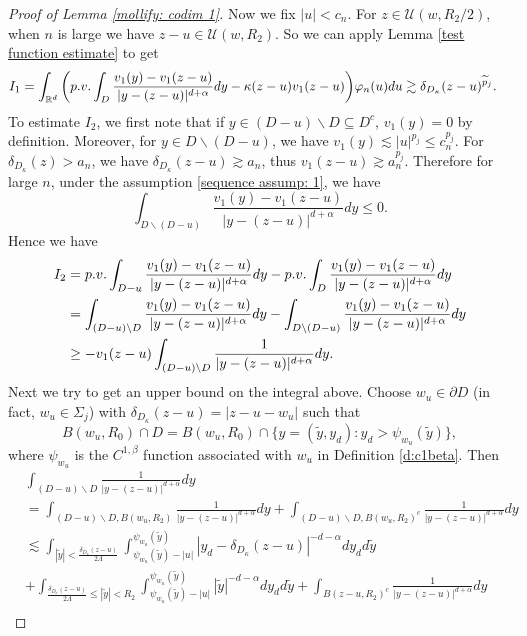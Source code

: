 \documentclass[12pt,a4paper]{amsart}
\numberwithin{equation}{section}
\theoremstyle{plain}
\newcommand{\be}{\beta}
\newcommand{\Si}{\Sigma}
\newcommand{\mc}{\mathcal}
\newcommand{\mb}{\mathbb}
\newcommand{\wt}{\widetilde}
\newcommand{\1}{\mathbbm{1}}
\begin{document}
\begin{proof}[Proof of Lemma \ref{mollify: codim 1}]
Now we fix $|u|<c_n$. For $z \in \mc U(w, R_2/2)$, when $n$ is large we have $z-u \in  \mc U(w, R_2)$. So we can apply Lemma \ref{test function estimate} to get
\begin{align*}
I_1 & = \int_{\mb R^d} \bigg({\rm p.v.}\int_{D} \frac{v_1(y) - v_1(z-u)}{|y-(z-u)|^{d+\alpha}}dy - \kappa(z-u)v_1(z-u) \bigg) \varphi_n(u)du \gtrsim \delta_{D_{\kappa}}(z-u)^{\wt p_j}.
\end{align*}
To estimate $I_2$,  we first note that if 
$y \in (D-u)\backslash D \subseteq D^c$, $v_1(y) = 0$ by definition. 
Moreover, for $y \in D\backslash (D-u)$, we have $v_1(y) \lesssim |u|^{p_j} \le c_n^{p_j}$. 
For $\delta_{D_{\kappa}}(z)>a_n$, we have $\delta_{D_{\kappa}}(z-u) \gtrsim a_n$, thus $v_1(z-u) \gtrsim a_n^{p_j}$. Therefore for large $n$, under the assumption \eqref{sequence assump: 1},  we have
$$\int_{D \backslash (D-u)} \frac{v_1(y) - v_1(z-u)}{|y-(z-u)|^{d+\alpha}}dy \le 0.$$
Hence we have 
\begin{align*}
I_2 & = {\rm p.v.}\int_{D -u} \frac{v_1(y) - v_1(z-u)}{|y-(z-u)|^{d+\alpha}}dy   - {\rm p.v.}\int_{D} \frac{v_1(y) - v_1(z-u)}{|y-(z-u)|^{d+\alpha}}dy \\
& = \int_{(D-u)\backslash D} \frac{v_1(y) - v_1(z-u)}{|y-(z-u)|^{d+\alpha}}dy - \int_{D \backslash (D-u)} \frac{v_1(y) - v_1(z-u)}{|y-(z-u)|^{d+\alpha}}dy \\
& \ge -v_1(z-u) \int_{(D-u)\backslash D} \frac{1}{|y-(z-u)|^{d+\alpha}}dy.
\end{align*} 
Next we try to get an upper bound on the integral above.
Choose $w_u \in \partial D$ (in fact, $w_u \in \Si_{j}$) with $\delta_{D_{\kappa}}(z-u) = |z-u - w_u|$ such that 
$$
B(w_u,R_0)\cap D = B(w_u,R_0) \cap \{y = (\wt y, y_d): y_d > 
\psi_{w_u}(\wt y)\},
$$
where $\psi_{w_u}$ is the $C^{1,\be}$ function associated with $w_u$ in Definition \ref{d:c1beta}. Then
\begin{align*}
& \int_{(D-u)\backslash D} \frac{1}{|y-(z-u)|^{d+\alpha}}dy \\
& = 
\int_{(D-u)\backslash D, B(w_u,R_2)} \frac{1}{|y-(z-u)|^{d+\alpha}}dy
+ \int_{(D-u)\backslash D, B(w_u,R_2)^c}
 \frac{1}{|y-(z-u)|^{d+\alpha}}dy \\
& \lesssim \int_{|\wt y|< \frac{\delta_{D_{\kappa}}(z-u)}{2\Lambda}} 
\int_{\psi_{w_u}(\wt y) - |u|}^{\psi_{w_u}(\wt y)} 
|y_d - \delta_{D_{\kappa}}(z-u)|^{-d-\alpha}dy_d d\wt y  \\
& + \int_{\frac{\delta_{D_{\kappa}}(z-u)}{2\Lambda} \le |\wt y|< R_2} 
\int_{\psi_{w_u}(\wt y) - |u|}^{\psi_{w_u}(\wt y)} 
|\wt y|^{-d-\alpha} dy_d d\wt y + \int_{B(z-u, R_2)^c} \frac{1}{|y-(z-u)|^{d+\alpha}}dy  \\

\end{align*}
\end{proof}
\end{document}
